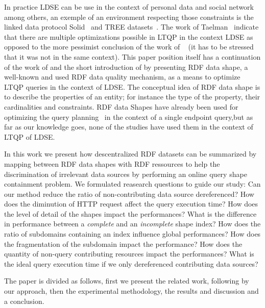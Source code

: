 In practice LDSE can be use in the context of personal data and social network among others,
an exemple of an environment respecting those constraints is the linked data protocol Solid~\cite{Taelman2023} and TREE datasets~\cite{tam_iswc_traversalsensortree_2024}.
The work of Taelman~\cite{Taelman2023} indicate that there are multiple optimizations possible in LTQP in the context LDSE as opposed to the
more pessimist conclusion of the work of ~\citeauthor{hartig2016walking} (it has to be stressed that it was not in the same context).
This paper position itself has a continuation of the work of \citeauthor{Taelman2023} and the short introduction of \citeauthor{tam2024opportunitiesshapebasedoptimizationlink} 
by presenting RDF data shape, a well-known and used RDF data quality mechanism, as a means to optimize LTQP queries in the context of LDSE.
The conceptual idea of RDF data shape is to describe the properties of an entity;
for instance the type of the property, their cardinalities and constraints.
RDF data Shapes have already been used for optimizing the query planning~\cite{kashif2021}
in the context of a single endpoint query,but as far as our knowledge goes, none of the studies have used them in the context of LTQP of LDSE.

In this work we present how descentralized RDF datasets can be summarized by mapping between RDF data shapes with RDF ressources 
to help the discrimination of irrelevant data sources by performing an online query shape containment problem.
We formulated reasearch questions to guide our study:
Can our method reduce the ratio of non-contributing data source dereferenced?
How does the diminution of HTTP request affect the query execution time?
How does the level of detail of the shapes impact the performances?
What is the difference in performance between a \emph{complete} and an \emph{incomplete} shape index?
How does the ratio of subdomains containing an index influence global performances?
How does the fragmentation of the subdomain impact the performance?
How does the quantity of non-query contributing resources impact the performances?
What is the ideal query execution time if we only dereferenced contributing data sources?

The paper is divided as follows, first we present the related work, following by our approach, then the
experimental methodology, the results and discussion and a conclusion.